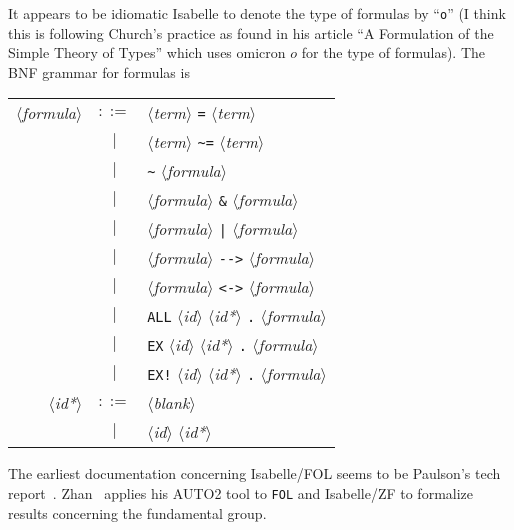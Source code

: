 \begin{node}[Formulas]\label{isabelle:fol-0001}%
It appears to be idiomatic Isabelle to denote the type of formulas by
``\texttt{o}'' (I think this is following Church's practice as found in
his article ``A Formulation of the Simple Theory of Types'' which uses
omicron $o$ for the type of formulas). The BNF grammar for formulas is
\begin{center}
\begin{tabular}{rcl}
$\langle$\textit{formula\/}$\rangle$ & $::=$ & $\langle$\textit{term\/}$\rangle$ \texttt{=} $\langle$\textit{term\/}$\rangle$\\
  & $\mid$ & $\langle$\textit{term\/}$\rangle$ \verb|~=| $\langle$\textit{term\/}$\rangle$\\
  & $\mid$ & \verb|~| $\langle$\textit{formula\/}$\rangle$\\
  & $\mid$ & $\langle$\textit{formula\/}$\rangle$ \verb#&# $\langle$\textit{formula\/}$\rangle$\\
  & $\mid$ & $\langle$\textit{formula\/}$\rangle$ \verb#|# $\langle$\textit{formula\/}$\rangle$\\
  & $\mid$ & $\langle$\textit{formula\/}$\rangle$ \verb#--># $\langle$\textit{formula\/}$\rangle$\\
  & $\mid$ & $\langle$\textit{formula\/}$\rangle$ \verb#<-># $\langle$\textit{formula\/}$\rangle$\\
  & $\mid$ & \texttt{ALL} $\langle$\textit{id\/}$\rangle$ $\langle$\textit{id*\/}$\rangle$ \texttt{.} $\langle$\textit{formula\/}$\rangle$\\
  & $\mid$ & \texttt{EX} $\langle$\textit{id\/}$\rangle$ $\langle$\textit{id*\/}$\rangle$ \texttt{.} $\langle$\textit{formula\/}$\rangle$\\
  & $\mid$ & \texttt{EX!} $\langle$\textit{id\/}$\rangle$ $\langle$\textit{id*\/}$\rangle$ \texttt{.} $\langle$\textit{formula\/}$\rangle$\\*
$\langle$\textit{id*\/}$\rangle$ & $::=$ & $\langle$\textit{blank\/}$\rangle$\\
& $\mid$ & $\langle$\textit{id\/}$\rangle$ $\langle$\textit{id*\/}$\rangle$\\
\end{tabular}
\end{center}
\end{node}

\begin{node}[References]\label{isabelle:fol-0002}%
The earliest documentation concerning Isabelle/FOL seems to be Paulson's
tech report~\cite{paulson1993object}. Zhan~\cite{Zhan2017formalization}
applies his AUTO2 tool to \texttt{FOL} and Isabelle/ZF to formalize
results concerning the fundamental group.
\end{node}
